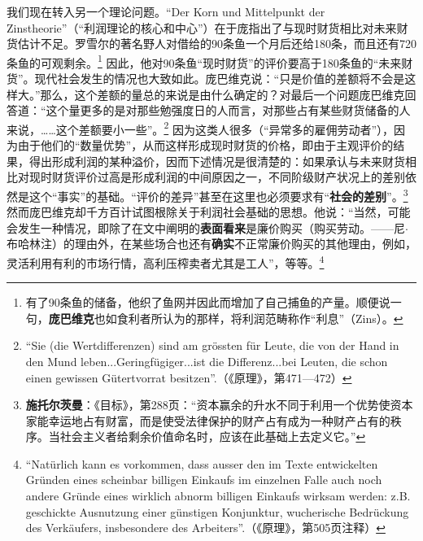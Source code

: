 \documentclass[fontset=fandol, a4paper, 12pt, openright]{ctexbook}
\begin{document}
我们现在转入另一个理论问题。“Der Korn und Mittelpunkt der Zinstheorie”（“利润理论的核心和中心”）在于庞指出了与现时财货相比对未来财货估计不足。罗雪尔的著名野人对借给的90条鱼一个月后还给180条，而且还有720条鱼的可观剩余。\footnote{有了90条鱼的储备，他织了鱼网并因此而增加了自己捕鱼的产量。顺便说一句，\textbf{庞巴维克}也如食利者所认为的那样，将利润范畴称作“利息”（Zins）。} 因此，他对90条鱼“现时财货”的评价要高于180条鱼的“未来财货”。现代社会发生的情况也大致如此。庞巴维克说：“只是价值的差额将不会是这样大。”那么，这个差额的量总的来说是由什么确定的？对最后一个问题庞巴维克回答道：“这个量更多的是对那些勉强度日的人而言，对那些占有某些财货储备的人来说，……这个差额要小一些”。\footnote{``Sie (die Wertdifferenzen) sind am gr\"{o}ssten f\"{u}r Leute, die von der Hand in den Mund leben...Geringf\"{u}giger...ist die Differenz...bei Leuten, die schon einen gewissen G\"{u}tertvorrat besitzen''.（《原理》，第471—472）} 因为这类人很多（“异常多的雇佣劳动者”），因为由于他们的“数量优势”，从而这样形成现时财货的价格，即由于主观评价的结果，得出形成利润的某种溢价，因而下述情况是很清楚的：如果承认与未来财货相比对现时财货评价过高是形成利润的中间原因之一，不同阶级财产状况上的差别依然是这个“事实”的基础。“评价的差异”甚至在这里也必须要求有“\textbf{社会的差别}”。\footnote{\textbf{施托尔茨曼}：《目标》，第288页：“资本赢余的升水不同于利用一个优势使资本家能幸运地占有财富，而是使受法律保护的财产占有成为一种财产占有的秩序。当社会主义者给剩余价值命名时，应该在此基础上去定义它。”} 然而庞巴维克却千方百计试图根除关于利润社会基础的思想。他说：“当然，可能会发生一种情况，即除了在文中阐明的\textbf{表面看来}是廉价购买（购买劳动。——尼$\cdot$布哈林注）的理由外，在某些场合也还有\textbf{确实}不正常廉价购买的其他理由，例如，灵活利用有利的市场行情，高利压榨卖者尤其是工人”，等等。\footnote{``Nat\"{u}rlich kann es vorkommen, dass ausser den im Texte entwickelten Gr\"{u}nden eines scheinbar billigen Einkaufs im einzelnen Falle auch noch andere Gr\"{u}nde eines wirklich abnorm billigen Einkaufs wirksam werden: z.B. geschickte Ausnutzung einer g\"{u}nstigen Konjunktur, wucherische Bedr\"{u}ckung des Verk\"{a}ufers, insbesondere des Arbeiters''.（《原理》，第505页注释）} 
\end{document}
